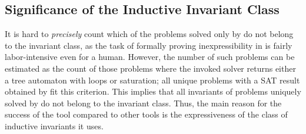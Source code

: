 \subsection{Significance of the Inductive Invariant Class}


It is hard to \emph{precisely} count which of the problems solved only by \theringenCICI{} do not belong to the \elemclass{} invariant class, as the task of formally proving inexpressibility in \elemclass{} is fairly labor-intensive even for a human. However, the number of such problems can be estimated as the count of those problems where the invoked solver returns either a tree automaton with loops or saturation; all unique problems with a SAT result obtained by \theringenCICI{} fit this criterion. This implies that all invariants of problems uniquely solved by \theringenCICI{} do not belong to the \elemclass{} invariant class. Thus, the main reason for the success of the \theringenCICI{} tool compared to other tools is the expressiveness of the class of inductive invariants it uses.
